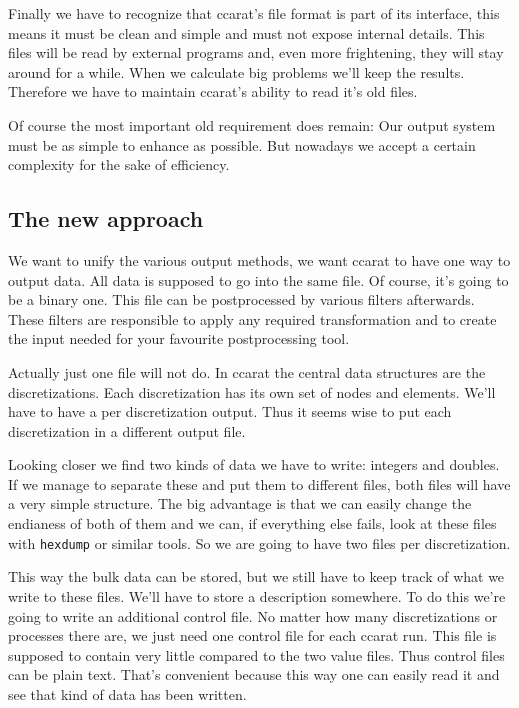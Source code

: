 Finally we have to recognize that ccarat's file format is part of
its interface, this means it must be clean and simple and must not
expose internal details. This files will be read by external programs
and, even more frightening, they will stay around for a while. When
we calculate big problems we'll keep the results. Therefore we have
to maintain ccarat's ability to read it's old files.

Of course the most important old requirement does remain: Our output
system must be as simple to enhance as possible. But nowadays we accept
a certain complexity for the sake of efficiency.


\subsection{The new approach}

We want to unify the various output methods, we want ccarat to have
one way to output data. All data is supposed to go into the same file.
Of course, it's going to be a binary one. This file can be postprocessed
by various filters afterwards. These filters are responsible to apply
any required transformation and to create the input needed for your
favourite postprocessing tool.

Actually just one file will not do. In ccarat the central data structures
are the discretizations. Each discretization has its own set of nodes
and elements. We'll have to have a per discretization output. Thus
it seems wise to put each discretization in a different output file.

Looking closer we find two kinds of data we have to write: integers
and doubles. If we manage to separate these and put them to different
files, both files will have a very simple structure. The big advantage
is that we can easily change the endianess of both of them and we
can, if everything else fails, look at these files with \texttt{hexdump}
or similar tools. So we are going to have two files per discretization.

This way the bulk data can be stored, but we still have to keep track
of what we write to these files. We'll have to store a description
somewhere. To do this we're going to write an additional control file.
No matter how many discretizations or processes there are, we just
need one control file for each ccarat run. This file is supposed to
contain very little compared to the two value files. Thus control
files can be plain text. That's convenient because this way one can
easily read it and see that kind of data has been written.


